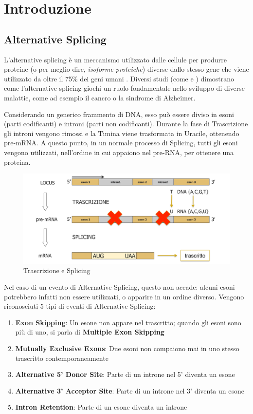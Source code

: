 \section{Introduzione}
\subsection{Alternative Splicing}

L'alternative splicing è un meccanismo utilizzato dalle cellule per produrre proteine (o per meglio dire, \textit{isoforme proteiche}) diverse dallo stesso gene che viene utilizzato da oltre il 75\% dei geni umani \cite{wang2008alternative}. Diversi studi (come \cite{tazi2009alternative} e \cite{rockenstein1995levels}) dimostrano come l'alternative splicing giochi un ruolo fondamentale nello sviluppo di diverse malattie, come ad esempio il cancro o la sindrome di Alzheimer.

Considerando un generico frammento di DNA, esso può essere diviso in esoni (parti codificanti) e introni (parti non codificanti). Durante la fase di Trascrizione gli introni vengono rimossi e la Timina viene trasformata in Uracile, ottenendo pre-mRNA. A questo punto, in un normale processo di Splicing, tutti gli esoni vengono utilizzati, nell'ordine in cui appaiono nel pre-RNA, per ottenere una proteina.

\begin{figure}[h!]
	\centering
	\includegraphics[width=\linewidth]{images/splicing.png}
  \caption{Trascrizione e Splicing}
  \label{fig:Splicing}
\end{figure}

Nel caso di un evento di Alternative Splicing, questo non accade: alcuni esoni potrebbero infatti non essere utilizzati, o apparire in un ordine diverso. Vengono riconosciuti 5 tipi di eventi di Alternative Splicing:

\begin{enumerate}
	\item \textbf{Exon Skipping}: Un esone non appare nel trascritto; quando gli esoni sono più di uno, si parla di \textbf{Multiple Exon Skipping}
	\item \textbf{Mutually Exclusive Exons}: Due esoni non compaiono mai in uno stesso trascritto contemporaneamente
	\item \textbf{Alternative 5' Donor Site}: Parte di un introne nel 5' diventa un esone
	\item \textbf{Alternative 3' Acceptor Site}: Parte di un introne nel 3' diventa un esone
	\item \textbf{Intron Retention}: Parte di un esone diventa un introne
\end{enumerate}

